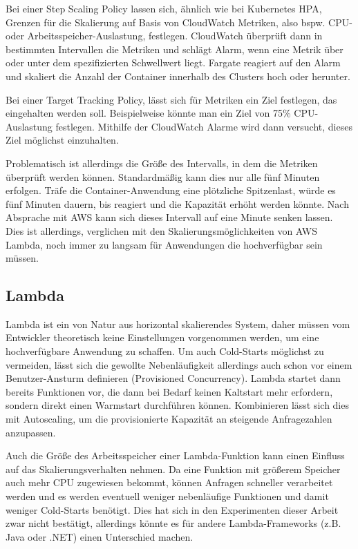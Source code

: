 Bei einer Step Scaling Policy lassen sich, ähnlich wie bei Kubernetes HPA, Grenzen für die Skalierung auf Basis von CloudWatch Metriken, also bspw. CPU- oder Arbeitsspeicher-Auslastung, festlegen. CloudWatch überprüft dann in bestimmten Intervallen die Metriken und schlägt Alarm, wenn eine Metrik über oder unter dem spezifizierten Schwellwert liegt. Fargate reagiert auf den Alarm und skaliert die Anzahl der Container innerhalb des Clusters hoch oder herunter. 

Bei einer Target Tracking Policy, lässt sich für Metriken ein Ziel festlegen, das eingehalten werden soll. Beispielweise könnte man ein Ziel von 75\% CPU-Auslastung festlegen. Mithilfe der CloudWatch Alarme wird dann versucht, dieses Ziel möglichst einzuhalten. 

Problematisch ist allerdings die Größe des Intervalls, in dem die Metriken überprüft werden können. Standardmäßig kann dies nur alle fünf Minuten erfolgen. Träfe die Container-Anwendung eine plötzliche Spitzenlast, würde es fünf Minuten dauern, bis reagiert und die Kapazität erhöht werden könnte. Nach Absprache mit AWS kann sich dieses Intervall auf eine Minute senken lassen. Dies ist allerdings, verglichen mit den Skalierungsmöglichkeiten von AWS Lambda, noch immer zu langsam für Anwendungen die hochverfügbar sein müssen.


\subsection{Lambda}
Lambda ist ein von Natur aus horizontal skalierendes System, daher müssen vom Entwickler theoretisch keine Einstellungen vorgenommen werden, um eine hochverfügbare Anwendung zu schaffen. Um auch Cold-Starts möglichst zu vermeiden, lässt sich die gewollte Nebenläufigkeit allerdings auch schon vor einem Benutzer-Ansturm definieren (Provisioned Concurrency). Lambda startet dann bereits Funktionen vor, die dann bei Bedarf keinen Kaltstart mehr erfordern, sondern direkt einen Warmstart durchführen können. Kombinieren lässt sich dies mit Autoscaling, um die provisionierte Kapazität an steigende Anfragezahlen anzupassen. 

Auch die Größe des Arbeitsspeicher einer Lambda-Funktion kann einen Einfluss auf das Skalierungsverhalten nehmen. Da eine Funktion mit größerem Speicher auch mehr CPU zugewiesen bekommt, können Anfragen schneller verarbeitet werden und es werden eventuell weniger nebenläufige Funktionen und damit weniger Cold-Starts benötigt. Dies hat sich in den Experimenten dieser Arbeit zwar nicht bestätigt, allerdings könnte es für andere Lambda-Frameworks (z.B. Java oder .NET) einen Unterschied machen.

